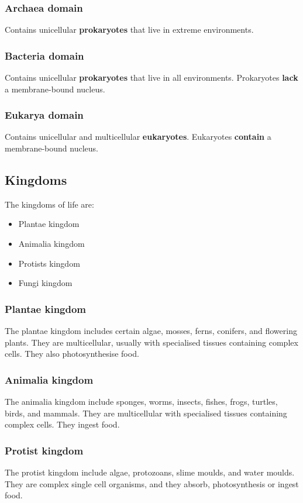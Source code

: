 \documentclass[11pt]{article}
\begin{document}
\subsubsection{Archaea domain}
\label{sec:org8857ebb}
Contains unicellular \textbf{prokaryotes} that live in extreme environments.
\subsubsection{Bacteria domain}
\label{sec:orgfb598a2}
Contains unicellular \textbf{prokaryotes} that live in all environments. Prokaryotes \textbf{lack} a membrane-bound nucleus.
\subsubsection{Eukarya domain}
\label{sec:org9b91034}
Contains unicellular and multicellular \textbf{eukaryotes}. Eukaryotes \textbf{contain} a membrane-bound nucleus.
\subsection{Kingdoms}
\label{sec:org8872f12}
The kingdoms of life are:
\begin{itemize}
\item Plantae kingdom
\item Animalia kingdom
\item Protists kingdom
\item Fungi kingdom
\end{itemize}
\subsubsection{Plantae kingdom}
\label{sec:org1fcaf0f}
The plantae kingdom includes certain algae, mosses, ferns, conifers, and flowering plants. They are multicellular, usually with specialised tissues containing complex cells. They also photosynthesise food.
\subsubsection{Animalia kingdom}
\label{sec:org2cf351d}
The animalia kingdom include sponges, worms, insects, fishes, frogs, turtles, birds, and mammals. They are multicellular with specialised tissues containing complex cells. They ingest food.
\subsubsection{Protist kingdom}
\label{sec:org2fa5a77}
The protist kingdom include algae, protozoans, slime moulds, and water moulds. They are complex single cell organisms, and they absorb, photosynthesis or ingest food.
\end{document}
